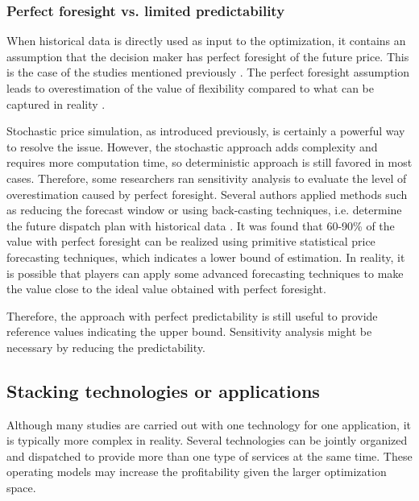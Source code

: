 \subsubsection{Perfect foresight vs. limited predictability}
\label{sec:perfect-forecast}
When historical data is directly used as input to the optimization, it contains an assumption that the decision maker has perfect foresight of the future price. This is the case of the studies mentioned previously \cite{Walawalkar2007,Sioshansi2009,Byrne2012,Bradbury2014,McConnell2015,Berrada2016,Salles2017}. The perfect foresight assumption leads to overestimation of the value of flexibility compared to what can be captured in reality \cite{Zucker2013}.

Stochastic price simulation, as introduced previously, is certainly a powerful way to resolve the issue. However, the stochastic approach adds complexity and requires more computation time, so deterministic approach is still favored in most cases. Therefore, some researchers ran sensitivity analysis to evaluate the level of overestimation caused by perfect foresight. Several authors applied methods such as reducing the forecast window \cite{Connolly2011} or using back-casting techniques, i.e. determine the future dispatch plan with historical data \cite{Sioshansi2009,Drury2011,Bathurst2003}. It was found that 60-90\% of the value with perfect foresight can be realized using primitive statistical price forecasting techniques, which indicates a lower bound of estimation. In reality, it is possible that players can apply some advanced forecasting techniques to make the value close to the ideal value obtained with perfect foresight. 

Therefore, the approach with perfect predictability is still useful to provide reference values indicating the upper bound. Sensitivity analysis might be necessary by reducing the predictability.

\subsection{Stacking technologies or applications}
\label{sec:lit-stacking}
Although many studies are carried out with one technology for one application, it is typically more complex in reality. Several technologies can be jointly organized and  dispatched to provide more than one type of services at the same time. These operating models may increase the profitability given the larger optimization space.

